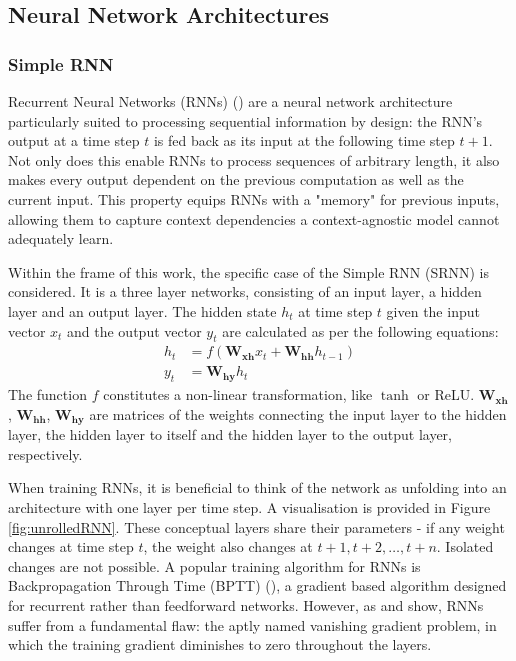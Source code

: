 \subsection{Neural Network Architectures}\label{neuralNetworkArchitectures}
\subsubsection{Simple RNN}\label{SRNN}
Recurrent Neural Networks (RNNs) (\cite{Elman1990}) are a neural network architecture particularly suited to processing sequential information by design: the RNN's output at a time step $t$ is fed back as its input at the following time step $t+1$. Not only does this enable RNNs to process sequences of arbitrary length, it also makes every output dependent on the previous computation as well as the current input. This property equips RNNs with a "memory" for previous inputs, allowing them to capture context dependencies a context-agnostic model cannot adequately learn.

Within the frame of this work, the specific case of the Simple RNN (SRNN) is considered. It is a three layer networks, consisting of an input layer, a hidden layer and an output layer. The hidden state $h_t$ at time step $t$ given the input vector $x_t$ and the output vector $y_t$ are calculated as per the following equations:
\begin{align}
	h_{t} &= f(\boldsymbol{W_{xh}} x_{t} + \boldsymbol{W_{hh}} h_{t-1}) \\
	y_{t} &= \boldsymbol{W_{hy}} h_{t}
\end{align}
The function $f$ constitutes a non-linear transformation, like $\tanh$ or ReLU. $\boldsymbol{W_{xh}}$, $\boldsymbol{W_{hh}}$, $\boldsymbol{W_{hy}}$ are matrices of the weights connecting the input layer to the hidden layer, the hidden layer to itself and the hidden layer to the output layer, respectively.

When training RNNs, it is beneficial to think of the network as unfolding into an architecture with one layer per time step. A visualisation is provided in Figure \ref{fig:unrolledRNN}. These conceptual layers share their parameters - if any weight changes at time step $t$, the weight also changes at $t+1, t+2, \dots, t+n$. Isolated changes are not possible. A popular training algorithm for RNNs is Backpropagation Through Time (BPTT) (\cite{Williams1998}), a gradient based algorithm designed for recurrent rather than feedforward networks. However, as \cite{Bengio1994} and \cite{Hochreiter1998} show, RNNs suffer from a fundamental flaw: the aptly named vanishing gradient problem, in which the training gradient diminishes to zero throughout the layers.

